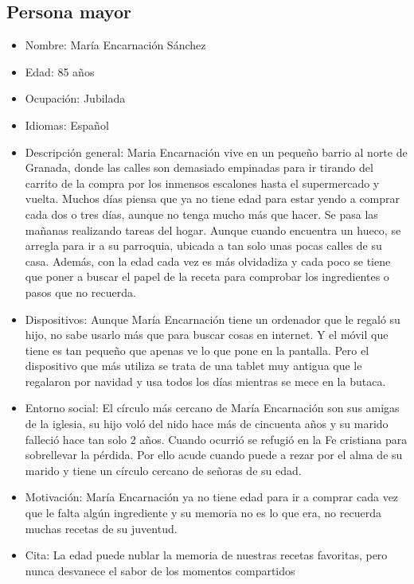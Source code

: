 \subsection{Persona mayor}
\begin{itemize}
    \item Nombre: María Encarnación Sánchez
    \item Edad: 85 años
    \item Ocupación: Jubilada
    \item Idiomas: Español
    \item Descripción general: Maria Encarnación vive en un pequeño barrio al norte de Granada, donde las calles son demasiado empinadas para ir tirando del carrito de la compra por los inmensos escalones hasta el supermercado y vuelta. Muchos días piensa que ya no tiene edad para estar yendo a comprar cada dos o tres días, aunque no tenga mucho más que hacer. Se pasa las mañanas realizando tareas del hogar. Aunque cuando encuentra un hueco, se arregla para ir a su parroquia, ubicada a tan solo unas pocas calles de su casa. Además, con la edad cada vez es más olvidadiza y cada poco se tiene que poner a buscar el papel de la receta para comprobar los ingredientes o pasos que no recuerda.
    \item Dispositivos: Aunque María Encarnación tiene un ordenador que le regaló su hijo, no sabe usarlo más que para buscar cosas en internet. Y el móvil que tiene es tan pequeño que apenas ve lo que pone en la pantalla. Pero el dispositivo que más utiliza se trata de una tablet muy antigua que le regalaron por navidad y usa todos los días mientras se mece en la butaca.
    \item Entorno social: El círculo más cercano de María Encarnación son sus amigas de la iglesia, su hijo voló del nido hace más de cincuenta años y su marido falleció hace tan solo 2 años. Cuando ocurrió se refugió en la Fe cristiana para sobrellevar la pérdida. Por ello acude cuando puede a rezar por el alma de su marido y tiene un círculo cercano de señoras de su edad. 
    \item Motivación: María Encarnación ya no tiene edad para ir a comprar cada vez que le falta algún ingrediente y su memoria no es lo que era, no recuerda muchas recetas de su juventud.
    \item Cita: La edad puede nublar la memoria de nuestras recetas favoritas, pero nunca desvanece el sabor de los momentos compartidos
\end{itemize}

